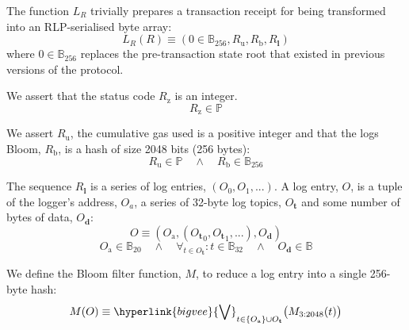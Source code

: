\documentclass[9pt,oneside]{amsart}
\makeatletter
\newcommand{\linkdest}[1]{\Hy@raisedlink{\hypertarget{#1}{}}}
\makeatother
\begin{document}
\begin{multicols}{2}
\hypertarget{transaction_receipt_preparation_function_for_RLP_serialisation}{}\linkdest{L__R}The function $L_{R}$ trivially prepares a transaction receipt for being transformed into an RLP-serialised byte array:
\begin{equation}
L_{R}(R) \equiv (0 \in \mathbb{B}_{256}, R_{\mathrm{u}}, R_{\mathrm{b}}, R_{\mathbf{l}})
\end{equation}
where $0 \in \mathbb{B}_{256}$ replaces the pre-transaction state root that existed in previous versions of the protocol.

\linkdest{R__z_assert}We assert that the status code $R_{\mathrm{z}}$ is an integer.
\begin{equation}
R_{\mathrm{z}} \in \mathbb{P}
\end{equation}

\linkdest{R__u_assert}We assert $R_{\mathrm{u}}$, the cumulative gas used is a positive integer and that the logs Bloom, $R_{\mathrm{b}}$, is a hash of size 2048 bits (256 bytes):
\begin{equation}
R_{\mathrm{u}} \in \mathbb{P} \quad \wedge \quad R_{\mathrm{b}} \in \mathbb{B}_{256}
\end{equation}


The sequence $R_{\mathbf{l}}$ is a series of log entries, $(O_0, O_1, ...)$. A log entry, $O$, is a tuple of the logger's address, $O_a$, a series of 32-byte log topics, $O_{\mathbf{t}}$ and some number of bytes of data, $O_{\mathbf{d}}$:
\begin{equation}
O \equiv (O_{\mathrm{a}}, ({O_{\mathbf{t}}}_0, {O_{\mathbf{t}}}_1, ...), O_{\mathbf{d}})
\end{equation}
\begin{equation}
O_{\mathrm{a}} \in \mathbb{B}_{20} \quad \wedge \quad \forall_{t \in O_{\mathbf{t}}}: t \in \mathbb{B}_{32} \quad \wedge \quad O_{\mathbf{d}} \in \mathbb{B}
\end{equation}

We define the Bloom filter function, $M$, to reduce a log entry into a single 256-byte hash:
\begin{equation}
M(O) \equiv \hyperlink{bigvee}{\bigvee}_{t \in \{O_{\mathrm{a}}\} \cup O_{\mathbf{t}}} \big( M_{3:2048}(t) \big)
\end{equation}


\end{multicols}
\end{document}
